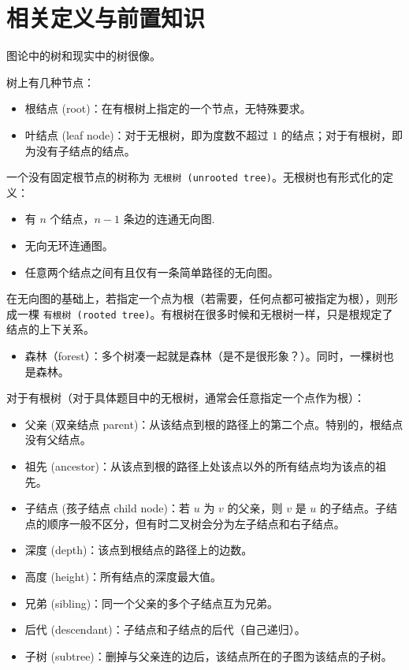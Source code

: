 \documentclass[10pt,twoside,a4paper,UTF8]{ctexbook}
\begin{document}
	\section{相关定义与前置知识}
	图论中的树和现实中的树很像。\par
	树上有几种节点：
	\begin{itemize}
		\item 根结点 (root)：在有根树上指定的一个节点，无特殊要求。
		\item 叶结点 (leaf node)：对于无根树，即为度数不超过 $1$ 的结点；对于有根树，即为没有子结点的结点。
	\end{itemize}\par
	一个没有固定根节点的树称为 \texttt{无根树 (unrooted tree)}。无根树也有形式化的定义：
	\begin{itemize}
		\item 有 $n$ 个结点，$n-1$ 条边的连通无向图.
		\item 无向无环连通图。
		\item 任意两个结点之间有且仅有一条简单路径的无向图。
	\end{itemize}\par
	在无向图的基础上，若指定一个点为根（若需要，任何点都可被指定为根），则形成一棵 \texttt{有根树 (rooted tree)}。有根树在很多时候和无根树一样，只是根规定了结点的上下关系。\par
	\begin{itemize}
		\item 森林（forest）：多个树凑一起就是森林（是不是很形象？）。同时，一棵树也是森林。
	\end{itemize}
	对于有根树（对于具体题目中的无根树，通常会任意指定一个点作为根）：
	\begin{itemize}
		\item 父亲 (双亲结点 parent)：从该结点到根的路径上的第二个点。特别的，根结点没有父结点。
		\item 祖先 (ancestor)：从该点到根的路径上处该点以外的所有结点均为该点的祖先。
		\item 子结点 (孩子结点 child node)：若 $u$ 为 $v$ 的父亲，则 $v$ 是 $u$ 的子结点。子结点的顺序一般不区分，但有时二叉树会分为左子结点和右子结点。
		\item 深度 (depth)：该点到根结点的路径上的边数。
		\item 高度 (height)：所有结点的深度最大值。
		\item 兄弟 (sibling)：同一个父亲的多个子结点互为兄弟。
		\item 后代 (descendant)：子结点和子结点的后代（自己递归）。
		\item 子树 (subtree)：删掉与父亲连的边后，该结点所在的子图为该结点的子树。
	\end{itemize}
	
\end{document}
